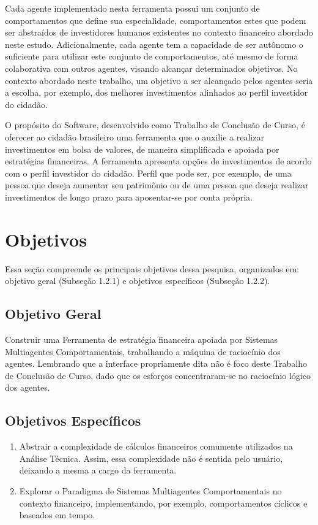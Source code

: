 Cada agente implementado nesta ferramenta possui um conjunto de comportamentos que define sua especialidade, comportamentos estes que podem ser abstraídos de investidores humanos existentes no contexto financeiro abordado neste estudo. Adicionalmente, cada agente tem a capacidade de ser autônomo o suficiente para utilizar este conjunto de comportamentos, até mesmo de forma colaborativa com outros agentes, visando alcançar determinados objetivos. No contexto abordado neste trabalho, um objetivo a ser alcançado pelos agentes seria a escolha, por exemplo, dos melhores investimentos alinhados ao perfil investidor do cidadão.

O propósito do Software, desenvolvido como Trabalho de Conclusão de Curso, é oferecer ao cidadão brasileiro uma ferramenta que o auxilie a realizar investimentos em bolsa de valores, de maneira simplificada e apoiada por estratégias financeiras. A ferramenta apresenta opções de investimentos de acordo com o perfil investidor do cidadão. Perfil que pode ser, por exemplo, de uma pessoa que deseja aumentar seu patrimônio ou de uma pessoa que deseja realizar investimentos de longo prazo para aposentar-se por conta própria.

\section{Objetivos}

Essa seção compreende os principais objetivos dessa pesquisa, organizados em: objetivo geral (Subseção 1.2.1) e objetivos específicos (Subseção 1.2.2).


\subsection {Objetivo Geral}

Construir uma Ferramenta de estratégia financeira apoiada por Sistemas Multiagentes Comportamentais, trabalhando a máquina de raciocínio dos agentes. Lembrando que a interface propriamente dita não é foco deste Trabalho de Conclusão de Curso, dado que os esforços  concentraram-se no raciocínio lógico dos agentes.


\subsection {Objetivos Específicos}

\begin{enumerate}
\item Abstrair a complexidade de cálculos financeiros comumente utilizados na Análise Técnica. Assim, essa complexidade não é sentida pelo usuário, deixando a mesma a cargo da ferramenta.
\item Explorar o Paradigma de Sistemas Multiagentes Comportamentais no contexto financeiro, implementando, por exemplo, comportamentos cíclicos e baseados em tempo.
\end{enumerate}


